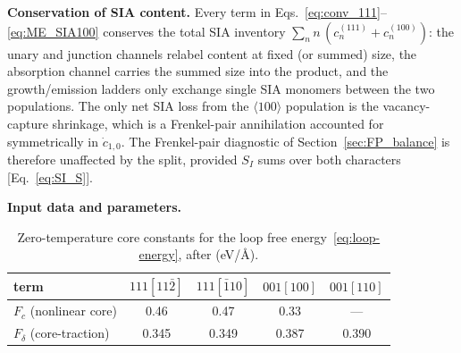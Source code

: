 \textbf{Conservation of SIA content.}
Every term in Eqs.~\eqref{eq:conv_111}--\eqref{eq:ME_SIA100} conserves the total
SIA inventory $\sum_n n\,(c^{(111)}_n + c^{(100)}_n)$: the unary and junction
channels relabel content at fixed (or summed) size, the absorption channel
carries the summed size into the product, and the growth/emission ladders only
exchange single SIA monomers between the two populations. The only net SIA loss
from the $\langle100\rangle$ population is the vacancy-capture shrinkage, which
is a Frenkel-pair annihilation accounted for symmetrically in $\dot c_{1,0}$.
The Frenkel-pair diagnostic of Section~\ref{sec:FP_balance} is therefore
unaffected by the split, provided $S_I$ sums over both characters
[Eq.~\eqref{eq:SI_S}].

\textbf{Input data and parameters.}
\label{sec:loop-conversion-data}
\begin{table}[ht]
\centering
\caption{Zero-temperature core constants for the loop free
energy~\eqref{eq:loop-energy}, after \cite{Dudarev2008} (eV/\AA).}
\label{tab:core-constants}
\begin{tabular}{lcccc}
\toprule
term & $111[11\bar2]$ & $111[\bar110]$ & $001[100]$ & $001[110]$ \\
\midrule
$F_c$ (nonlinear core)   & 0.46 & 0.47 & 0.33 & --- \\
$F_\delta$ (core-traction) & 0.345 & 0.349 & 0.387 & 0.390 \\
\bottomrule
\end{tabular}
\end{table}

